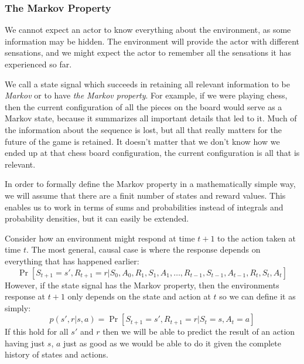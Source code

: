     \subsubsection{The Markov Property}
    We cannot expect an actor to know everything about the environment, as some 
    information may be hidden. The environment will provide the actor with 
    different sensations, and we might expect the actor to remember all the 
    sensations it has experienced so far.
    
    We call a state signal which succeeds in retaining all relevant information 
    to be \textit{Markov} or to have \textit{the Markov property}. For example, 
    if we were playing chess, then the current configuration of all the pieces 
    on the board would serve as a Markov state, because it summarizes all 
    important details that led to it. Much of the information about the 
    sequence is lost, but all that really matters for the future of the game is 
    retained. It doesn't matter that we don't know how we ended up at that 
    chess board configuration, the current configuration is all that is 
    relevant.
    
    In order to formally define the Markov property in a mathematically simple 
    way, we will assume that there are a finit number of states and reward 
    values. This enables us to work in terms of sums and probabilities instead 
    of integrals and probability densities, but it can easily be extended.
    
    Consider how an environment might respond at time $t+1$ to the action taken 
    at time $t$. The most general, causal case is where the response depends on 
    everything that has happened earlier:
    \begin{equation*}
        \Pr\left[S_{t+1} =s', 
        R_{t+1}=r|S_0,A_0,R_1,S_1,A_1,\dots,R_{t-1},S_{t-1},A_{t-1},R_t,S_t,A_t 
         \right]
    \end{equation*}
    However, if the state signal has the Markov property, then the environments 
    response at $t+1$ only depends on the state and action at $t$ so we can 
    define it as simply:
    \begin{equation*}
        p(s',r|s,a)=\Pr\left[S_{t+1}=s',R_{t+1}=r|S_t=s, A_t=a\right]
    \end{equation*}
    If this hold for all $s'$ and $r$ then we will be able to predict the 
    result of an action having just $s$, $a$ just as good as we would be able 
    to do it given the complete history of states and actions.
    
